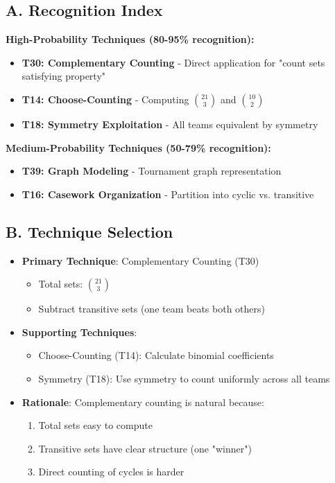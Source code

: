 \documentclass[]{article}
\begin{document}
\begin{techniquesbox}
\subsection*{A. Recognition Index}
\textbf{High-Probability Techniques (80-95\% recognition):}
\begin{itemize}[leftmargin=*]
    \item \textbf{T30: Complementary Counting} - Direct application for "count sets satisfying property"
    \item \textbf{T14: Choose-Counting} - Computing $\binom{21}{3}$ and $\binom{10}{2}$
    \item \textbf{T18: Symmetry Exploitation} - All teams equivalent by symmetry
\end{itemize}

\textbf{Medium-Probability Techniques (50-79\% recognition):}
\begin{itemize}[leftmargin=*]
    \item \textbf{T39: Graph Modeling} - Tournament graph representation
    \item \textbf{T16: Casework Organization} - Partition into cyclic vs. transitive
\end{itemize}

\subsection*{B. Technique Selection}
\begin{itemize}[leftmargin=*]
    \item \textbf{Primary Technique}: Complementary Counting (T30)
    \begin{itemize}
        \item Total sets: $\binom{21}{3}$
        \item Subtract transitive sets (one team beats both others)
    \end{itemize}
    \item \textbf{Supporting Techniques}: 
    \begin{itemize}
        \item Choose-Counting (T14): Calculate binomial coefficients
        \item Symmetry (T18): Use symmetry to count uniformly across all teams
    \end{itemize}
    \item \textbf{Rationale}: Complementary counting is natural because:
    \begin{enumerate}
        \item Total sets easy to compute
        \item Transitive sets have clear structure (one "winner")
        \item Direct counting of cycles is harder
    \end{enumerate}
\end{itemize}


\end{techniquesbox}
\end{document}
